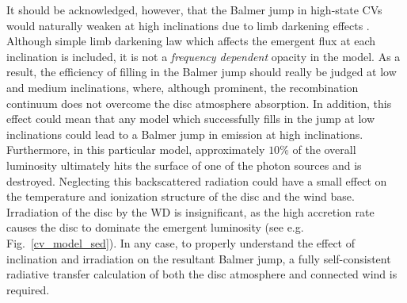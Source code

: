 It should be acknowledged, however,
that the Balmer jump in high-state CVs would naturally weaken at
high inclinations due to limb darkening effects \citep{ladous1989, ladous1989b}. 
Although simple limb darkening law which affects 
the emergent flux at each inclination is included,
it is not a {\em frequency dependent} opacity in the model.
As a result, the efficiency of filling in the Balmer jump
should really be judged at low and medium inclinations, 
where, although prominent, the recombination continuum does
not overcome the disc atmosphere absorption. 
In addition, this effect 
could mean that any model which successfully fills in the 
jump at low inclinations could lead to a Balmer jump 
in emission at high inclinations.
Furthermore, in this particular model,
approximately $10\%$ of the overall luminosity ultimately
hits the surface of one of the photon sources and is destroyed.
Neglecting this backscattered radiation could have a small effect on the temperature
and ionization structure of the disc and the wind base. Irradiation of the disc
by the WD is insignificant, as the high accretion rate causes the disc 
to dominate the emergent luminosity (see e.g. Fig.~\ref{cv_model_sed}).
In any case, to properly understand the 
effect of inclination and irradiation on the resultant 
Balmer jump, a fully self-consistent
radiative transfer calculation of both the disc atmosphere
and connected wind is required. 

